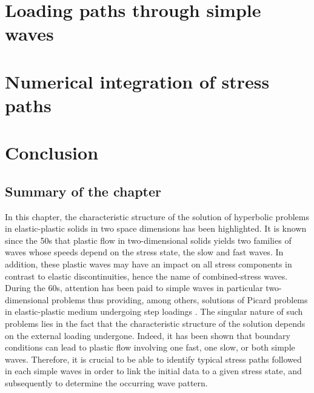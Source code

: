 \label{sec:charac_plast}


\section{Loading paths through simple waves}
\label{sec:stress_paths}



\section{Numerical integration of stress paths}
\label{sec:stress_paths_num}


% 


\section{Conclusion}

\subsection{Summary of the chapter}

In this chapter, the characteristic structure of the solution of hyperbolic problems in elastic-plastic solids in two space dimensions has been highlighted.
It is known since the 50s that plastic flow in two-dimensional solids yields two families of waves whose speeds depend on the stress state, the slow and fast waves.
In addition, these plastic waves may have an impact on all stress components in contrast to elastic discontinuities, hence the name of combined-stress waves.
During the 60s, attention has been paid to simple waves in particular two-dimensional problems thus providing, among others, solutions of Picard problems in elastic-plastic medium undergoing step loadings \cite{Clifton,Ting68,Ting73}. %
The singular nature of such problems lies in the fact that the characteristic structure of the solution depends on the external loading undergone.
Indeed, it has been shown \cite{Clifton} that boundary conditions can lead to plastic flow involving one fast, one slow, or both simple waves.
Therefore, it is crucial to be able to identify typical stress paths followed in each simple waves in order to link the initial data to a given stress state, and subsequently to determine the occurring wave pattern.


